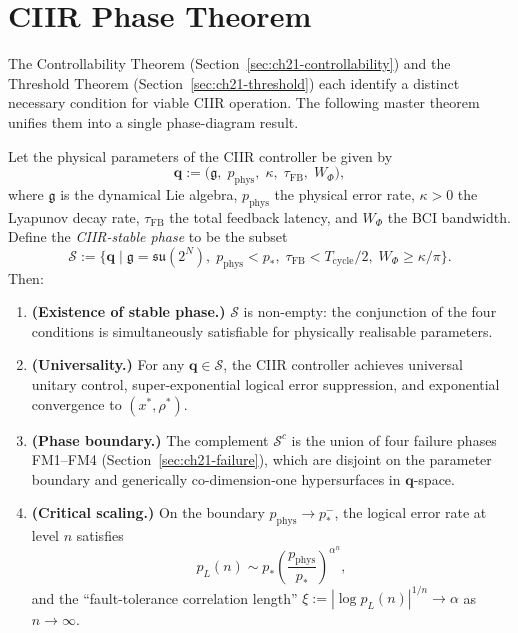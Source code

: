 \section{CIIR Phase Theorem}
\label{sec:ch21-phase}

The Controllability Theorem (Section~\ref{sec:ch21-controllability}) and
the Threshold Theorem (Section~\ref{sec:ch21-threshold}) each identify a
distinct necessary condition for viable CIIR operation.  The following
master theorem unifies them into a single phase-diagram result.

\begin{theorem}\label{thm:phase}
Let the physical parameters of the CIIR controller be given by
\[
  \mathbf{q}
  := \bigl(
       \mathfrak{g},\;
       p_{\mathrm{phys}},\;
       \kappa,\;
       \tau_{\mathrm{FB}},\;
       W_\Phi
     \bigr),
\]
where $\mathfrak{g}$ is the dynamical Lie algebra, $p_{\mathrm{phys}}$
the physical error rate, $\kappa > 0$ the Lyapunov decay rate,
$\tau_{\mathrm{FB}}$ the total feedback latency, and $W_\Phi$ the BCI
bandwidth.  Define the \emph{CIIR-stable phase} to be the subset
\begin{equation}\label{eq:stable-phase}
  \mathcal{S}
  := \bigl\{
       \mathbf{q}
       \;\big|\;
       \mathfrak{g} = \mathfrak{su}(2^N),\;
       p_{\mathrm{phys}} < p_*,\;
       \tau_{\mathrm{FB}} < T_{\mathrm{cycle}}/2,\;
       W_\Phi \geq \kappa/\pi
     \bigr\}.
\end{equation}
Then:
\begin{enumerate}[label=(\roman*), nosep]
  \item \textbf{(Existence of stable phase.)} $\mathcal{S}$ is non-empty:
        the conjunction of the four conditions is simultaneously satisfiable
        for physically realisable parameters.
  \item \textbf{(Universality.)} For any $\mathbf{q} \in \mathcal{S}$, the
        CIIR controller achieves universal unitary control, super-exponential
        logical error suppression, and exponential convergence to $(x^*,\rho^*)$.
  \item \textbf{(Phase boundary.)} The complement $\mathcal{S}^c$ is the
        union of four failure phases FM1--FM4 (Section~\ref{sec:ch21-failure}),
        which are disjoint on the parameter boundary and generically co-dimension-one
        hypersurfaces in $\mathbf{q}$-space.
  \item \textbf{(Critical scaling.)}  On the boundary $p_{\mathrm{phys}} \to p_*^-$,
        the logical error rate at level $n$ satisfies
        \[
          p_L(n) \sim p_* \!\left(\frac{p_{\mathrm{phys}}}{p_*}\right)^{\!\alpha^n},
        \]
        and the ``fault-tolerance correlation length''
        $\xi := |\log p_L(n)|^{1/n} \to \alpha$ as $n \to \infty$.
\end{enumerate}
\end{theorem}


